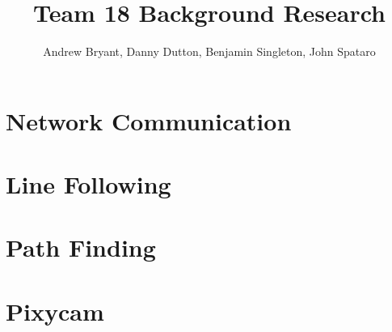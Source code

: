 \documentclass[12pt,letterpaper]{article}
\author{Andrew Bryant, Danny Dutton, Benjamin Singleton, John Spataro}
\title{Team 18 Background Research}
\begin{document}
\maketitle

\section{Network Communication}

\section{Line Following}

\section{Path Finding}

\section{Pixycam}
\end{document}
